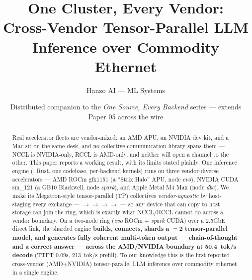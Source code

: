 \documentclass[11pt]{article}
\title{\textbf{One Cluster, Every Vendor:\\ Cross-Vendor Tensor-Parallel LLM Inference over Commodity Ethernet}}
\author{Hanzo AI --- ML Systems}
\date{Distributed companion to the \emph{One Source, Every Backend} series --- extends Paper 05 across the wire}
\begin{document}
\maketitle

\begin{abstract}
Real accelerator fleets are vendor-mixed: an AMD APU, an NVIDIA dev kit, and a Mac sit on the same
desk, and no collective-communication library spans them --- NCCL is NVIDIA-only, RCCL is AMD-only, and
neither will open a channel to the other. This paper reports a working result, with its limits stated
plainly. One inference engine (, Rust, one codebase, per-backend kernels) runs
on three vendor-diverse accelerators --- AMD ROCm gfx1151 (a ``Strix Halo'' APU, node \emph{evo}), NVIDIA
CUDA sm\_121 (a GB10 Blackwell, node \emph{spark}), and Apple Metal M4 Max (node \emph{dbc}). We make its
Megatron-style tensor-parallel (TP) collectives \emph{vendor-agnostic} by host-staging every exchange
--- $\to$$\to$$\to$$\to$ --- so any device that
can copy to host storage can join the ring, which is exactly what NCCL/RCCL cannot do across a vendor
boundary. On a two-node ring (\emph{evo} ROCm $+$ \emph{spark} CUDA) over a 2.5GbE direct link, the
sharded engine \textbf{builds, connects, shards a $=$2 tensor-parallel model, and
generates fully coherent multi-token output --- chain-of-thought and a correct answer --- across the
AMD/NVIDIA boundary at 50.4~tok/s decode} (TTFT 0.09s, 213~tok/s prefill). To our knowledge this is the
first reported cross-vendor (AMD$+$NVIDIA) tensor-parallel LLM inference over commodity ethernet in a
single engine.


\end{abstract}
\end{document}
